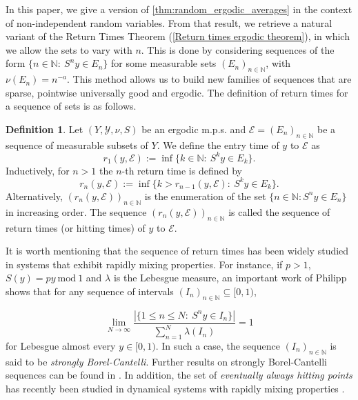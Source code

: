 \documentclass[11pt]{amsart}
\numberwithin{equation}{section}
\theoremstyle{definition}
\newtheorem{definition}[lemma]{Definition}
\newcommand{\Mod}[1]{\ \mathrm{mod}\ #1}
\theoremstyle{plain}
\newcommand{\N}{{\mathbb N}}
\begin{document}
 In this paper, we give a version of \cref{thm:random_ergodic_averages} in the context of non-independent random variables. 
 From that result, we retrieve a natural variant of the Return Times Theorem (\cref{Return times ergodic theorem}), in which we allow the sets to vary with $n$. This is done by considering sequences of the form $\{n\in \N:\ S^ny\in E_n\}$ for some measurable sets $(E_n)_{n\in \N}$, with $\nu(E_n)=n^{-a}$. 
 This method allows us to build new families of sequences that are sparse, pointwise universally good and ergodic. The definition of return times for a sequence of sets is as follows.
 
\begin{definition}
    Let $(Y,\mathcal{Y},\nu,S)$ be an ergodic m.p.s. and $\mathcal{E}=(E_n)_{n\in\N}$ be a sequence of measurable subsets of $Y$. We define the entry time of $y$ to $\mathcal{E}$ as $$r_1(y,\mathcal{E}):=\inf\{k\in \N:\ S^ky\in E_k\}.$$ Inductively, for $n>1$ the $n$-th return time is defined by
    $$r_n(y,\mathcal{E}):=\inf\{k>r_{n-1}(y,\mathcal{E}):\ S^ky\in E_k\}.$$
    Alternatively, $(r_n(y,\mathcal{E}))_{n\in \N}$ is the enumeration of the set $\{n\in \N: S^ny \in E_n  \}$ in increasing order. 
    The sequence $(r_n(y,\mathcal{E}))_{n\in \N}$ is called the sequence of return times (or hitting times) of $y$ to $\mathcal{E}$.
    \label{def:return_times}
\end{definition}

It is worth mentioning that the sequence of return times has been widely studied in systems that exhibit rapidly mixing properties. For instance, if $p>1$, $S(y)=p y\Mod{1}$ and $\lambda$ is the Lebesgue measure, an important work of Philipp \cite{Philipp_Walter} shows that for any sequence of intervals $(I_n)_{n\in \N}\subseteq [0,1)$,

\begin{equation}
\lim_{N\to\infty}\dfrac{|\{1\leq n\leq N:\ S^ny\in I_n\}|}{\sum_{n=1}^N\lambda(I_n)}=1\label{sBC_}
\end{equation}
for Lebesgue almost every $y\in [0,1)$. In such a case, the sequence $(I_n)_{n\in\N}$ is said to be \emph{strongly Borel-Cantelli}. Further results on strongly Borel-Cantelli sequences can be found in \cite{NonUniformly_BorelCantelli,Kim,Kleinbock_Margulis,LeVeque,Persson_Rodriguez}. In addition, the set of \emph{eventually always hitting points} has recently been studied in dynamical systems with rapidly mixing properties \cite{Ganotaki_Persson,Kirsebom_Kunde_Persson,Kleinbock_Konstantoulas_Richter}. 
\medskip
\end{document}
